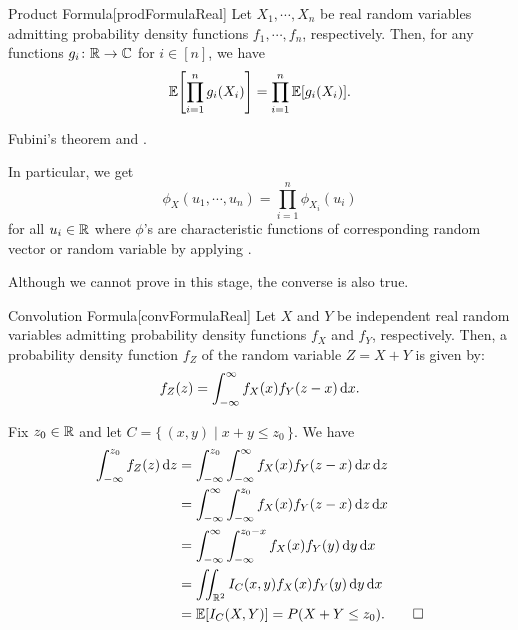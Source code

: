 \documentclass[../probability.tex]{subfiles}
\begin{document}
\begin{Lemma}{Product Formula}[prodFormulaReal]
    Let \(X_1, \cdots, X_n\) be real random variables admitting probability density functions \(f_1,
    \cdots, f_n\), respectively. Then, for any functions \(g_i \colon \RR \to \CC\) for \(i \in
    [n]\), we have
    \[
        \mathbb{E}\Biggl[ \prod_{i=1}^n g_i(X_i) \Biggr]
        = \prod_{i=1}^n \mathbb{E}[g_i(X_i)]\text.
    \]
\end{Lemma}
\begin{myproof}[Proof]
    Fubini's theorem and .
\end{myproof}

\begin{note}
    In particular, we get
    \[
        \phi_X(u_1, \cdots, u_n) = \prod_{i=1}^n \phi_{X_i}(u_i)
    \]
    for all \(u_i \in \RR\) where \(\phi\)'s are characteristic functions of corresponding
    random vector or random variable
    by applying .

    Although we cannot prove in this stage,
    the converse is also true.
\end{note}

\begin{Lemma}{Convolution Formula}[convFormulaReal]
    Let \(X\) and \(Y\) be independent real random variables
    admitting probability density functions \(f_X\) and \(f_Y\), respectively.
    Then, a probability density function \(f_Z\) of the random variable \(Z = X + Y\)
    is given by:
    \[
        f_Z(z) = \int_{-\infty}^{\infty} f_X(x) f_Y(z-x) \,\mathrm{d} x\text.
    \]
\end{Lemma}
\begin{myproof}[Proof]
    Fix \(z_0 \in \RR\) and let \(C = \{\,(x, y) \mid x + y \le z_0\,\}\).
    We have
    \begin{align*}
        \int_{-\infty}^{z_0} f_Z(z) \d z
        &= \int_{-\infty}^{z_0} \int_{-\infty}^{\infty} f_X(x) f_Y(z-x) \d x \d z \\
        &= \int_{-\infty}^{\infty} \int_{-\infty}^{z_0} f_X(x) f_Y(z-x) \d z \d x \\
        &= \int_{-\infty}^{\infty} \int_{-\infty}^{z_0-x} f_X(x) f_Y(y) \d y \d x \\
        &= \iint_{\RR[2]} I_C(x, y)f_X(x) f_Y(y) \d y \d x \\
        &= \mbb{E}[I_C(X, Y)] = P(X+Y \le z_0)\text. \qedhere
    \end{align*}
\end{myproof}
\end{document}
